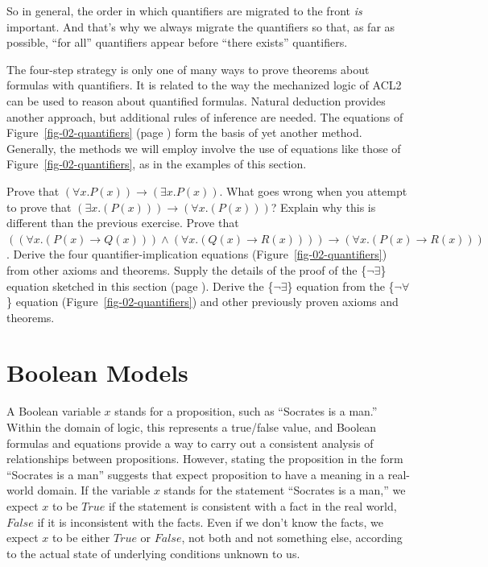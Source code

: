 {So in general, the order in which quantifiers are migrated to the front \emph{is}
important. And that's why we always migrate the quantifiers so that, as far as
possible, ``for all'' quantifiers appear before ``there exists'' quantifiers.

The four-step strategy is only one of many ways to prove theorems about
formulas with quantifiers. It is related to the way
the mechanized logic of ACL2 can be used to reason about quantified formulas.
Natural deduction provides another approach, but additional rules of inference
are needed.
The equations of Figure~\ref{fig-02-quantifiers} (page \pageref{fig-02-quantifiers})
form the basis of yet another method.
Generally, the methods we will employ involve the use of equations
like those of Figure~\ref{fig-02-quantifiers}, as in the examples
of this section.

\begin{ExerciseList}
\Exercise Prove that $(\forall x.P(x)) \rightarrow (\exists x.P(x))$.
\Exercise What goes wrong when you attempt to prove that $(\exists x.(P(x))) \rightarrow (\forall x.(P(x)))$?
Explain why this is different than the previous exercise.
\Exercise Prove that $((\forall x.(P(x) \rightarrow Q(x))) \wedge (\forall x.(Q(x) \rightarrow R(x)))) \rightarrow (\forall x.(P(x) \rightarrow R(x)))$.
\Exercise Derive the four quantifier-implication equations (Figure~\ref{fig-02-quantifiers})
from other axioms and theorems.
\Exercise Supply the details of the proof of the \{$\neg\exists$\} equation sketched in this section
(page \pageref{why-neg-forall}).
\Exercise Derive the \{$\neg\exists$\} equation from the \{$\neg\forall$\} equation
(Figure~\ref{fig-02-quantifiers}) and
other previously proven axioms and theorems.

\end{ExerciseList}


\section{Boolean Models}
\label{sec:boolean-models}

A Boolean variable $x$
stands for a proposition, such as ``Socrates is a man.''
Within the domain of logic, this represents a true/false value,
and Boolean formulas and equations provide a way to carry out
a consistent analysis of relationships between propositions.
However, stating the proposition in the form ``Socrates is a man''
suggests that expect proposition to have a meaning in a real-world domain.
If the variable $x$ stands for the statement ``Socrates is a man,''
we expect $x$ to be $True$ if the statement is consistent with a fact
in the real world, $False$ if it is inconsistent with the facts.
Even if we don't know the facts, we expect $x$ to be either $True$ or $False$,
not both and not something else,
according to the actual state of underlying conditions unknown to us.

}
